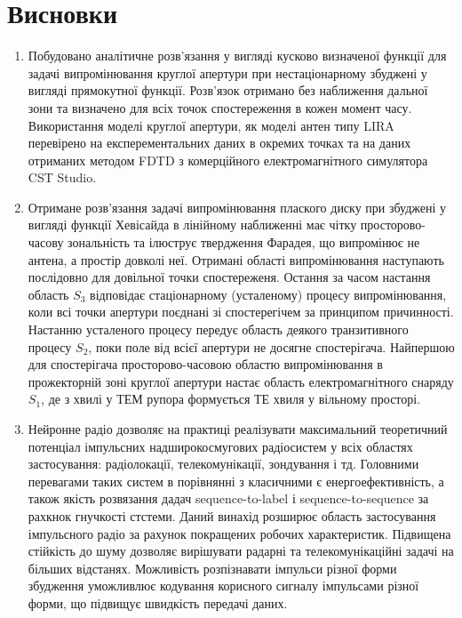 \chapter*{Висновки}

\begin{enumerate}

\item Побудовано аналітичне розв'язання у вигляді кусково визначеної функції для 
задачі випромінювання круглої апертури при нестаціонарному збуджені у вигляді 
прямокутної функції. Розв'язок отримано без наближення дальної зони та визначено 
для всіх точок спостереження в кожен момент часу. Використання моделі круглої 
апертури, як моделі антен типу LIRA перевірено на експерементальних даних в 
окремих точках та на даних отриманих методом FDTD з комерційного електромагнітного 
симулятора CST Studio.

\item Отримане розв'язання задачі випромінювання плаского диску при збуджені у 
вигляді функції Хевісайда в лінійному наближенні має чітку просторово-часову 
зональність та ілюструє твердження Фарадея, що випромінює не антена, а простір 
довколі неї. Отримані області випромінювання наступають послідовно для довільної 
точки спостереженя. Остання за часом настання область $ S_3 $ відповідає 
стаціонарному (усталеному) процесу випромінювання, коли всі точки апертури 
поєднані зі спостерегічем за принципом причинності. Настанню усталеного процесу 
передує область деякого транзитивного процесу $ S_2 $, поки поле від всієї 
апертури не досягне спостерігача. Найпершою для спостерігача просторово-часовою 
областю випромінювання в прожекторній зоні круглої апертури настає область 
електромагнітного снаряду $ S_1 $, де з хвилі у ТЕМ рупора формується ТЕ хвиля 
у вільному просторі.

\item Нейронне радіо дозволяє на практиці реалізувати максимальний теоретичний
потенціал імпульсних надширокосмугових радіосистем у всіх областях застосування:  
радіолокації, телекомунікації, зондування і тд. Головними перевагами таких систем 
в порівнянні з класичними є енергоефективність, а також якість розвязання дадач 
sequence-to-label і sequence-to-sequence за рахкнок гнучкості стстеми.
Даний винахід розширює область застосування імпульсного радіо за 
рахунок покращених робочих характеристик. Підвищена стійкість до 
шуму дозволяє вирішувати радарні та телекомунікаційні задачі на 
більших відстанях. Можливість розпізнавати імпульси різної форми 
збудження уможливлює кодування корисного сигналу імпульсами різної форми, 
що підвищує швидкість передачі даних. 

\end{enumerate}
